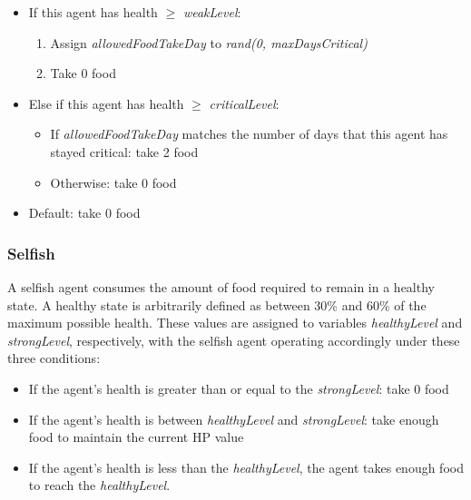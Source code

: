 \begin{itemize}
    \item If this agent has health $\geq$ \textit{weakLevel}:
    \begin{enumerate}
        \item Assign \textit{allowedFoodTakeDay} to \textit{rand(0, maxDaysCritical)}
        \item Take 0 food
    \end{enumerate}
    \item Else if this agent has health $\geq$ \textit{criticalLevel}:
    \begin{itemize}
        \item If \textit{allowedFoodTakeDay} matches the number of days that this agent has stayed critical: take 2 food
        \item Otherwise: take 0 food
    \end{itemize}
    \item Default: take 0 food
\end{itemize}

\subsubsection{Selfish}

A selfish agent consumes the amount of food required to remain in a healthy state. A healthy state is arbitrarily defined as between 30\% and 60\% of the maximum possible health. These values are assigned to variables \textit{healthyLevel} and \textit{strongLevel}, respectively, with the selfish agent operating accordingly under these three conditions:

\begin{itemize}
    \item If the agent's health is greater than or equal to the \textit{strongLevel}: take 0 food
    \item If the agent's health is between \textit{healthyLevel} and \textit{strongLevel}: take enough food to maintain the current HP value
    \item If the agent's health is less than the \textit{healthyLevel}, the agent takes enough food to reach the \textit{healthyLevel}.
\end{itemize}




